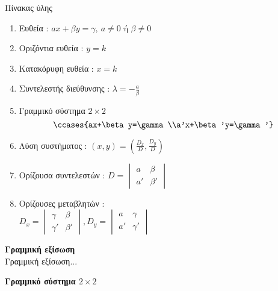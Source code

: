 \documentclass[twoside,nofonts,internet,math,spyros]{frontisthrio}
\begin{document}
\begin{mybox}[mysubtitle]{Πίνακας ύλης}
\begin{multicols}{2}
\begin{enumerate}[itemsep=0mm]
\item Ευθεία : $ ax+\beta y=\gamma,\ a\neq0\textrm{ ή }\beta\neq0 $
\item Οριζόντια ευθεία : $ y=k $
\item Κατακόρυφη ευθεία : $ x=k $
\item Συντελεστής διεύθυνσης : $ \lambda=-\frac{a}{\beta} $
\item Γραμμικό σύστημα $ 2\times 2 $
\[ \ccases{ax+\beta y=\gamma\\a'x+\beta'y=\gamma'} \]
\item Λύση συστήματος : $ (x,y)=\left(\frac{D_x}{D},\frac{D_y}{D}\right) $
\item Ορίζουσα συντελεστών : $ D=\begin{vmatrix}
a & \beta\\a' & \beta'
\end{vmatrix}$
\item Ορίζουσες μεταβλητών :\\$ D_x=\begin{vmatrix}
\gamma & \beta\\\gamma' & \beta'
\end{vmatrix},D_y=\begin{vmatrix}
a & \gamma\\a' & \gamma'
\end{vmatrix} $
\end{enumerate}
\end{multicols}
\end{mybox}
\newpage
\orismoi
\begin{arithmisi}
\item\textbf{Γραμμική εξίσωση}\\
Γραμμική εξίσωση...
\item\textbf{Γραμμικό σύστημα $ 2\times 2 $}
\end{arithmisi}
\thewrhmata
\end{document}
